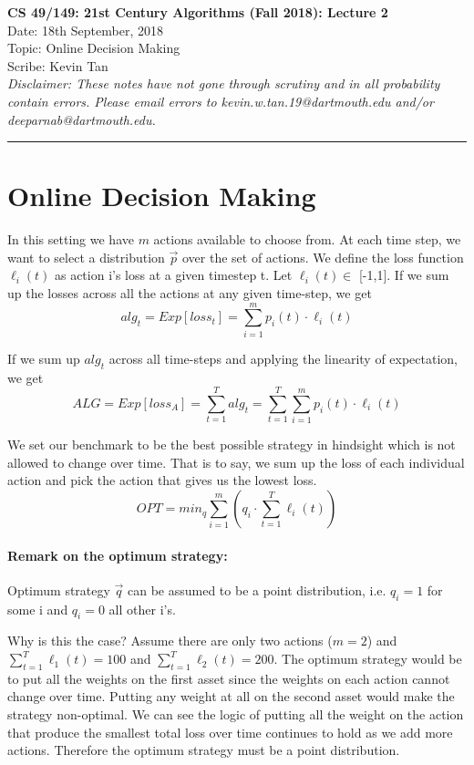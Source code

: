 \documentclass[11pt]{article}
\begin{document}
	\begin{center}
		{\bf \Large CS 49/149: 21st Century Algorithms (Fall 2018): Lecture 2}\\ 
		Date: 18th September, 2018 \\
		Topic: Online Decision Making \\
		Scribe: Kevin Tan \\
		{\em Disclaimer: These notes have not gone through scrutiny and in all probability contain errors. Please email errors to kevin.w.tan.19@dartmouth.edu and/or deeparnab@dartmouth.edu.}
	\end{center}
\hrule height 2pt
\vspace{3ex}
\def\loss{\mathsf{loss}}
\section{Online Decision Making}

In this setting we have $m$ actions available to choose from. At each time step, we want to select a distribution $\Vec{p}$ over the set of actions. We define the loss function $\ell_{i} (t)$ as action i's loss at a given timestep t. Let $\ell_{i} (t) \in $ [-1,1]. If we sum up the losses across all the actions at any given time-step, we get $$alg_t = Exp[loss_t] = \sum_{i=1}^{m} p_i(t) \cdot \ell_i(t)$$

If we sum up $alg_t$ across all time-steps and applying the linearity of expectation, we get $$ALG = Exp[loss_A] = \sum_{t=1}^{T} alg_t = \sum_{t=1}^{T} \sum_{i=1}^{m} p_i(t)\cdot \ell_i(t) $$

We set our benchmark to be the best possible strategy in hindsight which is not allowed to change over time. That is to say, we sum up the loss of each individual action and pick the action that gives us the lowest loss.  $$OPT = min_{q} \sum_{i = 1}^{m} (q_i \cdot \sum_{t=1}^{T} \ell_i(t))$$

\paragraph{Remark on the optimum strategy:}
Optimum strategy $\Vec{q}$ can be assumed to be a point distribution, i.e. $q_i = 1$ for some i and $q_i = 0$ all other i's. 

Why is this the case? Assume there are only two actions ($m = 2$) and $\sum_{t=1}^{T} \ell_1(t) = 100$ and $\sum_{t=1}^{T} \ell_2(t) = 200$. The optimum strategy would be to put all the weights on the first asset since the weights on each action cannot change over time. Putting any weight at all on the second asset would make the strategy non-optimal. We can see the logic of putting all the weight on the action that produce the smallest total loss over time continues to hold as we add more actions. Therefore the optimum strategy must be a point distribution.
\newpage
\end{document}
